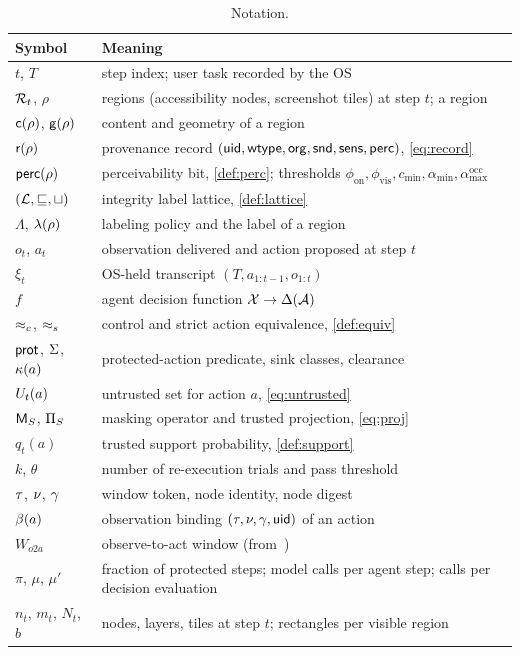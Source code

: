 \begin{table}[t]
\centering
\caption{Notation.}
\label{tab:notation}
\footnotesize
\begin{tabularx}{\textwidth}{@{}l X@{}}
\toprule
Symbol & Meaning \\
\midrule
$t$, $T$ & step index; user task recorded by the OS \\
$\mathcal{R}_t$, $\rho$ & regions (accessibility nodes, screenshot tiles) at step $t$; a region \\
$\mathsf{c}(\rho)$, $\mathsf{g}(\rho)$ & content and geometry of a region \\
$\mathsf{r}(\rho)$ & provenance record $(\mathsf{uid},\mathsf{wtype},\mathsf{org},\mathsf{snd},\mathsf{sens},\mathsf{perc})$, \cref{eq:record} \\
$\mathsf{perc}(\rho)$ & perceivability bit, \cref{def:perc}; thresholds $\phi_{\mathrm{on}},\phi_{\mathrm{vis}},c_{\min},\alpha_{\min},\alpha^{\mathrm{occ}}_{\max}$ \\
$(\mathcal{L},\sqsubseteq,\sqcup)$ & integrity label lattice, \cref{def:lattice} \\
$\Lambda$, $\lambda(\rho)$ & labeling policy and the label of a region \\
$o_t$, $a_t$ & observation delivered and action proposed at step $t$ \\
$\xi_t$ & OS-held transcript $(T,a_{1:t-1},o_{1:t})$ \\
$f$ & agent decision function $\mathcal{X}\to\Delta(\mathcal{A})$ \\
$\approx_c$, $\approx_s$ & control and strict action equivalence, \cref{def:equiv} \\
$\mathsf{prot}$, $\Sigma$, $\kappa(a)$ & protected-action predicate, sink classes, clearance \\
$U_t(a)$ & untrusted set for action $a$, \cref{eq:untrusted} \\
$\mathsf{M}_S$, $\Pi_S$ & masking operator and trusted projection, \cref{eq:proj} \\
$q_t(a)$ & trusted support probability, \cref{def:support} \\
$k$, $\theta$ & number of re-execution trials and pass threshold \\
$\tau$, $\nu$, $\gamma$ & window token, node identity, node digest \\
$\beta(a)$ & observation binding $(\tau,\nu,\gamma,\mathsf{uid})$ of an action \\
$W_{o2a}$ & observe-to-act window (from~\cite{qian2026zeropermission}) \\
$\pi$, $\mu$, $\mu'$ & fraction of protected steps; model calls per agent step; calls per decision evaluation \\
$n_t$, $m_t$, $N_t$, $b$ & nodes, layers, tiles at step $t$; rectangles per visible region \\
\bottomrule
\end{tabularx}
\end{table}

